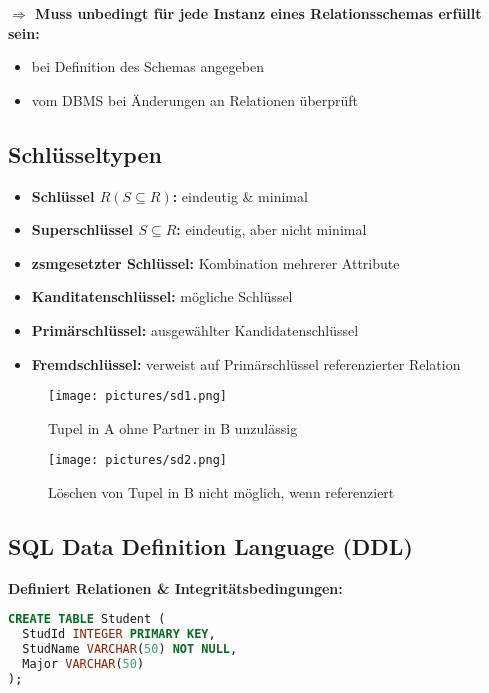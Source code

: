 \documentclass[12pt,a4paper]{article}
\begin{document}
\textbf{$\Rightarrow$ Muss unbedingt für jede Instanz eines Relationsschemas erfüllt sein:}
\begin{itemize}
\item bei Definition des Schemas angegeben
\item vom DBMS bei Änderungen an Relationen überprüft
\end{itemize}

\subsection{Schlüsseltypen}

\begin{itemize}
\item \textbf{Schlüssel $R(S \subseteq R)$:} eindeutig \& minimal
\item \textbf{Superschlüssel $S \subseteq R$:} eindeutig, aber nicht minimal
\item \textbf{zsmgesetzter Schlüssel:} Kombination mehrerer Attribute
\item \textbf{Kanditatenschlüssel:} mögliche Schlüssel
\item \textbf{Primärschlüssel:} ausgewählter Kandidatenschlüssel
\item \textbf{Fremdschlüssel:} verweist auf Primärschlüssel referenzierter Relation
\end{itemize}

\begin{figure}[H]
\begin{minipage}[t]{0.45\textwidth}
\centering
\texttt{[image: pictures/sd1.png]}
\caption{Tupel in A ohne Partner in B unzulässig}
\end{minipage}
\hfill
\begin{minipage}[t]{0.5\textwidth}
\centering
\texttt{[image: pictures/sd2.png]}
\caption{Löschen von Tupel in B nicht möglich, wenn referenziert}
\end{minipage}
\end{figure}

\subsection{SQL Data Definition Language (DDL)}

\textbf{Definiert Relationen \& Integritätsbedingungen:}
\begin{lstlisting}[language = SQL]
CREATE TABLE Student (
  StudId INTEGER PRIMARY KEY,
  StudName VARCHAR(50) NOT NULL,
  Major VARCHAR(50)
);
\end{lstlisting}
\end{document}
